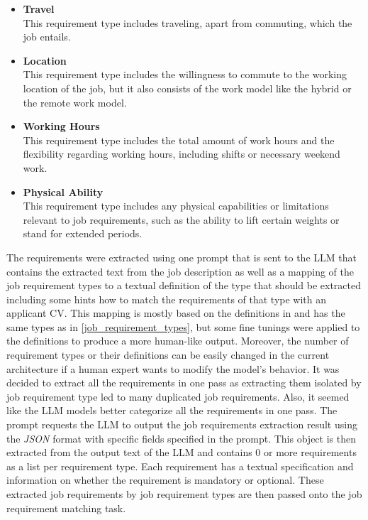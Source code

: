 \documentclass[draft,final]{thesisclass} %
\begin{document}
\begin{itemize}
    \item \textbf{Travel}\\
    This requirement type includes traveling, apart from commuting, which the job entails.
    \item \textbf{Location}\\
    This requirement type includes the willingness to commute to the working location of the job, but it also consists of the work model like the hybrid or the remote work model.
    \item \textbf{Working Hours}\\
    This requirement type includes the total amount of work hours and the flexibility regarding working hours, including shifts or necessary weekend work.
    \item \textbf{Physical Ability}\\
    This requirement type includes any physical capabilities or limitations relevant to job requirements, such as the ability to lift certain weights or stand for extended periods.
\end{itemize}
The requirements were extracted using one prompt that is sent to the \acs{LLM} that contains the extracted text from the job description as well as a mapping of the job requirement types to a textual definition of the type that should be extracted including some hints how to match the requirements of that type with an applicant \acs{CV}.
This mapping is mostly based on the definitions in \textcite{job_requirement_types} and has the same types as in \ref{job_requirement_types}, but some fine tunings were applied to the definitions to produce a more human-like output.
Moreover, the number of requirement types or their definitions can be easily changed in the current architecture if a human expert wants to modify the model's behavior.
It was decided to extract all the requirements in one pass as extracting them isolated by job requirement type led to many duplicated job requirements.
Also, it seemed like the \acs{LLM} models better categorize all the requirements in one pass.
The prompt requests the \acs{LLM} to output the job requirements extraction result using the \textit{JSON} format with specific fields specified in the prompt.
This  object is then extracted from the output text of the \acs{LLM} and contains $0$ or more requirements as a list per requirement type.
Each requirement has a textual specification and information on whether the requirement is mandatory or optional.
These extracted job requirements by job requirement types are then passed onto the job requirement matching task.
\end{document}

